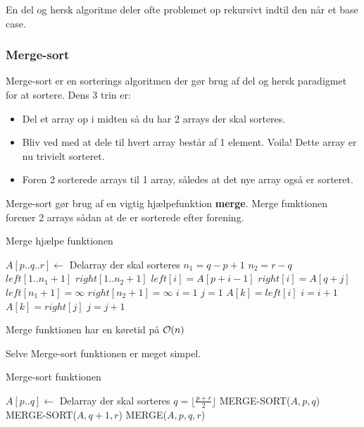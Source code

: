 En del og hersk algoritme deler ofte problemet op rekursivt indtil den når et base case. 

\subsubsection{Merge-sort}
Merge-sort er en sorterings algoritmen der gør brug af del og hersk paradigmet for at sortere. Dens 3 trin er:
\begin{itemize}
\item Del et array op i midten så du har 2 arrays der skal sorteres.
\item Bliv ved med at dele til hvert array består af 1 element. Voila! Dette array er nu trivielt sorteret.
\item Foren 2 sorterede arrays til 1 array, således at det nye array også er sorteret.
\end{itemize}

Merge-sort gør brug af en vigtig hjælpefunktion \textbf{merge}. Merge funktionen forener 2 arrays sådan at de er sorterede efter forening.

\begin{algorithm}[H]
  \caption{Merge hjælpe funktionen}
  \begin{algorithmic}[1]
    \State $A[p..q..r] \gets$ Delarray der skal sorteres  
    \State $n_1 = q - p + 1$
    \State $n_2 = r - q$
    \State $left[1 .. n_1 + 1]$
    \State $right[1 .. n_2 + 1]$
    \State $left[i] = A[p + i - 1]$ 
    \EndFor
    \State $right[i] = A[q + j]$ 
    \EndFor
    \State $left[n_1 + 1] = \infty$
    \State $right[n_2 + 1] = \infty$ 
    \State $i = 1$
    \State $j = 1$
    \State $A[k] = left[i]$
    \State $i = i + 1$
    \Else
    \State $A[k] = right[j]$
    \State $j = j + 1$
    \EndIf
    \EndFor
    \EndFunction
  \end{algorithmic}
\end{algorithm}

Merge funktionen har en køretid på $\mathcal{O}(n)$

Selve Merge-sort funktionen er meget simpel.
\begin{algorithm}[H]
  \caption{Merge-sort funktionen}
  \begin{algorithmic}[1]
    \State $A[p..q] \gets$ Delarray der skal sorteres  
    \State $q = \lfloor \frac{p + r}{2} \rfloor$
    \State MERGE-SORT($A, p, q$)
    \State MERGE-SORT($A, q + 1, r$)
    \State MERGE($A, p, q, r$)
    \EndIf
    \EndFunction
  \end{algorithmic}
\end{algorithm}

